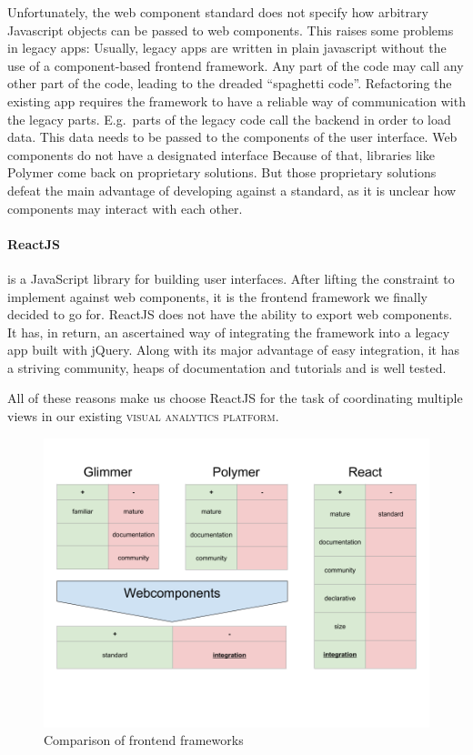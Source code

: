 \documentclass{article}
\newcommand{\visan}{\textsc{visual analytics platform}}
\begin{document}
Unfortunately, the web component standard does not specify how arbitrary Javascript objects can be passed to web components.
This raises some problems in legacy apps:
Usually, legacy apps are written in plain javascript without the use of a component-based frontend framework.
Any part of the code may call any other part of the code, leading to the dreaded ``spaghetti code''.
Refactoring the existing app requires the framework to have a reliable way of communication with the legacy parts.
E.g.\ parts of the legacy code call the backend in order to load data.
This data needs to be passed to the components of the user interface.
Web components do not have a designated interface
Because of that, libraries like Polymer come back on proprietary solutions.
But those proprietary solutions defeat the main advantage of developing against a standard, as it is unclear how components may interact with each other.

\paragraph{ReactJS} is a JavaScript library for building user interfaces\cite{React2017}.
After lifting the constraint to implement against web components, it is the frontend framework we finally decided to go for.
ReactJS does not have the ability to export web components.
It has, in return, an ascertained way of integrating the framework into a legacy app built with jQuery.
Along with its major advantage of easy integration, it has a striving community, heaps of documentation and tutorials and is well tested.

All of these reasons make us choose ReactJS for the task of coordinating multiple views in our existing \visan{}.




\begin{figure}[h!]
  \centering
  \includegraphics[width=\textwidth]{images/frontend-frameworks.png}
  \caption{Comparison of frontend frameworks}\label{fig:implementation:frontend-frameworks}
\end{figure}
\end{document}
